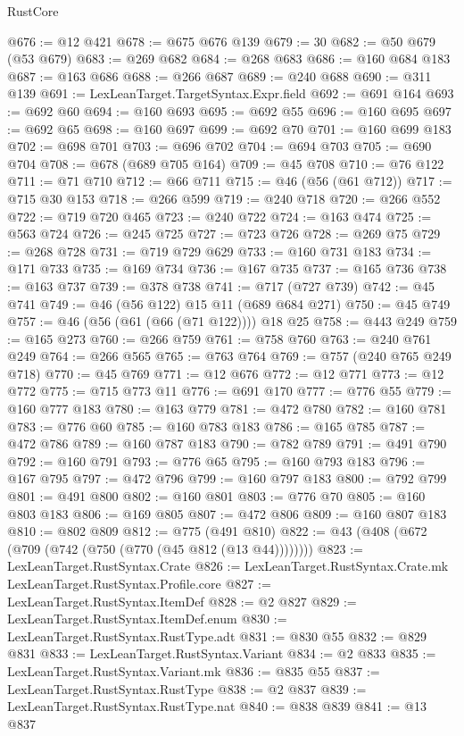 \begin{lexlean}{RustCore}
\begin{coremodule}
@676 := @12 @421
@678 := @675 @676 @139
@679 := 30
@682 := @50 @679 (@53 @679)
@683 := @269 @682
@684 := @268 @683
@686 := @160 @684 @183
@687 := @163 @686
@688 := @266 @687
@689 := @240 @688
@690 := @311 @139
@691 := LexLeanTarget.TargetSyntax.Expr.field
@692 := @691 @164
@693 := @692 @60
@694 := @160 @693
@695 := @692 @55
@696 := @160 @695
@697 := @692 @65
@698 := @160 @697
@699 := @692 @70
@701 := @160 @699 @183
@702 := @698 @701
@703 := @696 @702
@704 := @694 @703
@705 := @690 @704
@708 := @678 (@689 @705 @164)
@709 := @45 @708
@710 := @76 @122
@711 := @71 @710
@712 := @66 @711
@715 := @46 (@56 (@61 @712))
@717 := @715 @30 @153
@718 := @266 @599
@719 := @240 @718
@720 := @266 @552
@722 := @719 @720 @465
@723 := @240 @722
@724 := @163 @474
@725 := @563 @724
@726 := @245 @725
@727 := @723 @726
@728 := @269 @75
@729 := @268 @728
@731 := @719 @729 @629
@733 := @160 @731 @183
@734 := @171 @733
@735 := @169 @734
@736 := @167 @735
@737 := @165 @736
@738 := @163 @737
@739 := @378 @738
@741 := @717 (@727 @739)
@742 := @45 @741
@749 := @46 (@56 @122) @15 @11 (@689 @684 @271)
@750 := @45 @749
@757 := @46 (@56 (@61 (@66 (@71 @122)))) @18 @25
@758 := @443 @249
@759 := @165 @273
@760 := @266 @759
@761 := @758 @760
@763 := @240 @761 @249
@764 := @266 @565
@765 := @763 @764
@769 := @757 (@240 @765 @249 @718)
@770 := @45 @769
@771 := @12 @676
@772 := @12 @771
@773 := @12 @772
@775 := @715 @773 @11
@776 := @691 @170
@777 := @776 @55
@779 := @160 @777 @183
@780 := @163 @779
@781 := @472 @780
@782 := @160 @781
@783 := @776 @60
@785 := @160 @783 @183
@786 := @165 @785
@787 := @472 @786
@789 := @160 @787 @183
@790 := @782 @789
@791 := @491 @790
@792 := @160 @791
@793 := @776 @65
@795 := @160 @793 @183
@796 := @167 @795
@797 := @472 @796
@799 := @160 @797 @183
@800 := @792 @799
@801 := @491 @800
@802 := @160 @801
@803 := @776 @70
@805 := @160 @803 @183
@806 := @169 @805
@807 := @472 @806
@809 := @160 @807 @183
@810 := @802 @809
@812 := @775 (@491 @810)
@822 := @43 (@408 (@672 (@709 (@742 (@750 (@770 (@45 @812 (@13 @44))))))))
@823 := LexLeanTarget.RustSyntax.Crate
@826 := LexLeanTarget.RustSyntax.Crate.mk LexLeanTarget.RustSyntax.Profile.core
@827 := LexLeanTarget.RustSyntax.ItemDef
@828 := @2 @827
@829 := LexLeanTarget.RustSyntax.ItemDef.enum
@830 := LexLeanTarget.RustSyntax.RustType.adt
@831 := @830 @55
@832 := @829 @831
@833 := LexLeanTarget.RustSyntax.Variant
@834 := @2 @833
@835 := LexLeanTarget.RustSyntax.Variant.mk
@836 := @835 @55
@837 := LexLeanTarget.RustSyntax.RustType
@838 := @2 @837
@839 := LexLeanTarget.RustSyntax.RustType.nat
@840 := @838 @839
@841 := @13 @837

\end{coremodule}
\end{lexlean}
